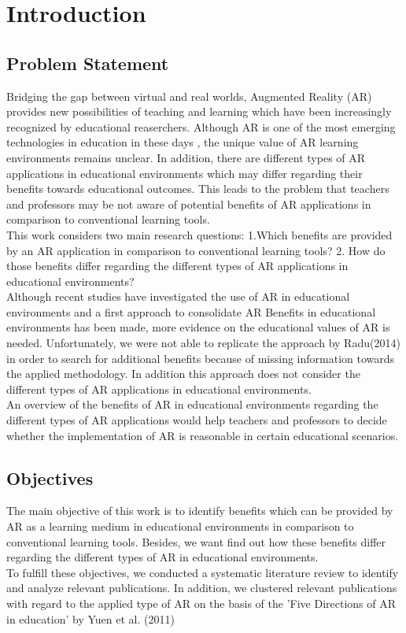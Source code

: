 \section{Introduction}
\subsection{Problem Statement}
Bridging the gap between virtual and real worlds, Augmented Reality (AR) provides new possibilities of teaching and learning which have been increasingly recognized by educational reaserchers. \autocite [cf.][41]{Wu.2013} Although AR is one of the most emerging technologies in education in these days \autocite [cf.][]{Johnson.2010}, the unique value of AR learning environments remains unclear. \autocite [cf.][48]{Wu.2013} In addition, there are different types of AR applications in educational environments which may differ regarding their benefits towards educational outcomes. \autocite [cf.][127-130]{Yuen.2011} This leads to the problem that teachers and professors may be not aware of potential benefits of AR applications in comparison to conventional learning tools. \\
This work considers two main research questions: 1.Which benefits are provided by an AR application in comparison to conventional learning tools? 2. How do those benefits differ regarding the different types of AR applications in educational environments? \\
Although recent studies have investigated the use of AR in educational environments \autocite {Wu.2013}\mulcit\autocite {Lee.2012} and a first approach to consolidate AR Benefits in educational environments has been made, \autocite [cf.][]{Radu.2014} more evidence on the educational values of AR is needed. Unfortunately, we were not able to replicate the approach by Radu(2014) in order to search for additional benefits because of missing information towards the applied methodology. In addition this approach does not consider the different types of AR applications in educational environments.\\
An overview of the benefits of AR in educational environments regarding the different types of AR applications would help teachers and professors to decide whether the implementation of AR is reasonable in certain educational scenarios.\\
\subsection{Objectives}
The main objective of this work is to identify benefits which can be provided by AR as a learning medium in educational environments in comparison to conventional learning tools. Besides, we want find out how these benefits differ regarding the different types of AR in educational environments. \\
To fulfill these objectives, we conducted a systematic literature review to identify and analyze relevant publications. In addition, we clustered relevant publications with regard to the applied type of AR on the basis of the 'Five Directions of AR in education' by Yuen et al. (2011)
